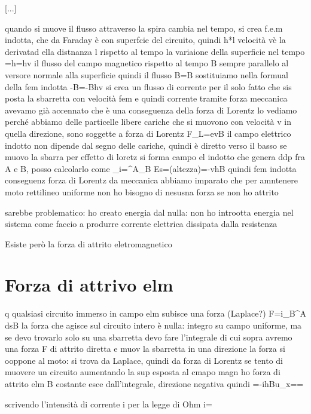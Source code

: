 {[...]


quando si muove il flusso attraverso la spira cambia nel tempo, si crea f.e.m indotta, che da Faraday è 
con \Sigma superfcie del circuito, quindi h*l
velocità vè la derivatad ella distnanza l rispetto al tempo
la variaione della superficie nel tempo =h=hv
il flusso del campo magnetico rispetto al tempo
B sempre parallelo al versore normale alla superficie
quindi il flusso \Phi\vba B=B\Sigma
sostituiamo nella formual della fem indotta
-B=-Bhv
si crea un flusso di corrente per il solo fatto che sis posta la sbarretta con velocità
fem e quindi corrente tramite forza meccanica
avevamo già accennato che è una conseguenza della forza di Lorentz
lo vediamo perché abbiamo delle particelle libere cariche che si muovono con velocità v in quella direzione, sono soggette a forza di Lorentz \vba F_L=e\vba v\crossvba B
il campo elettrico indotto non dipende dal segno delle cariche, quindi è diretto verso il basso
se muovo la sbarra per effetto di loretz si forma campo el indotto che genera ddp fra A e B, posso calcolarlo come
_i=\int^A_B \vba E\vdotd\vba s=(altezza)=-\vba vhB
quindi fem indotta conseguenz forza di Lorentz
da meccanica abbiamo imparato che per amntenere moto rettilineo uniforme non ho bisogno di nesusna forza se non ho attrito

sarebbe problematico: ho creato energia dal nulla: non ho introotta energia nel sistema come faccio a produrre corrente elettrica dissipata dalla resistenza

Esiste però la forza di attrito eletromagnetico

\section{Forza di attrivo elm}q
qualsiasi circuito immerso in campo elm subisce una forza (Laplace?)
\vba F=i\int_B^A d\vba s\cross\vba B
la forza che agisce sul circuito intero è nulla: integro su campo uniforme, ma se devo trovarlo solo su una sbarretta devo fare l'integrale di cui sopra
avremo una forza F di attrito diretta
e muov la sbarretta in una direzione la forza si ooppone al moto: 
si trova da Laplace, quindi da forza di Lorentz
se tento di muovere un circuito aumentando la sup esposta al cmapo magn ho forza di attrito elm
B costante esce dall'integrale, direzione negativa quindi =-ihB\vbh u_x==

scrivendo l'intensità di corrente i per la legge di Ohm i=}
